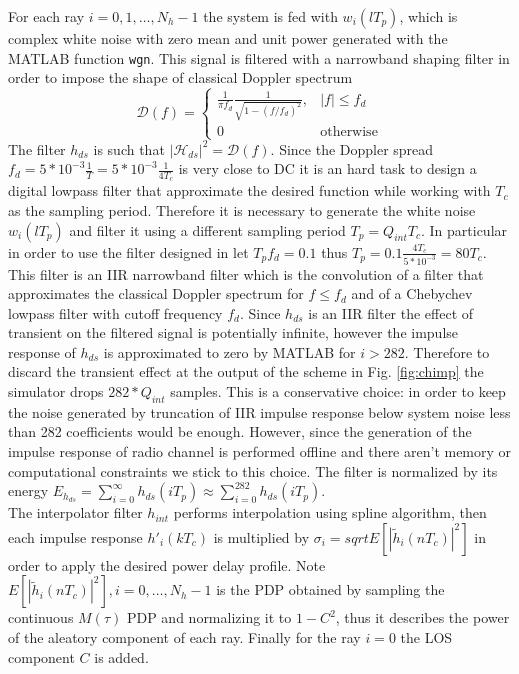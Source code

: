 \documentclass[10pt]{article}
\begin{document}
For each ray $i = 0, 1, \dots, N_h -1$ the system is fed with $w_i(lT_p)$, which is complex white noise with zero mean and unit power generated with the MATLAB function \texttt{wgn}. This signal is filtered with a narrowband shaping filter in order to impose the shape of classical Doppler spectrum
\begin{equation}
  \mathcal{D}(f) =  \begin{cases} \frac{1}{\pi f_d} \frac{1}{\sqrt{1-(f/f_d)^2}}, & |f| \le f_d \\
                                  0                                              & \mbox{otherwise}
                   \end{cases}
\end{equation}
The filter $h_{ds}$ is such that $|\mathcal{H}_{ds}|^2 = \mathcal{D}(f)$. Since the Doppler spread $f_d = 5*10^{-3}\frac{1}{T} = 5*10^{-3}\frac{1}{4T_c}$ is very close to DC it is an hard task to design a digital lowpass filter that approximate the desired function while working with $T_c$ as the sampling period. Therefore it is necessary to generate the white noise $w_i(lT_p)$ and filter it using a different sampling period $T_p = Q_{int}T_c$. In particular in order to use the filter designed in \cite{anachugg} let $T_p f_d = 0.1$ thus $T_p = 0.1 \frac{4 T_c}{5*10^{-3}} = 80 T_c$. \\
This filter is an IIR narrowband filter which is the convolution of a filter that approximates the classical Doppler spectrum for $f \le f_d$ and of a Chebychev lowpass filter with cutoff frequency $f_d$. Since $h_{ds}$ is an IIR filter the effect of transient on the filtered signal is potentially infinite, however the impulse response of $h_{ds}$ is approximated to zero by MATLAB for $i > 282$. Therefore to discard the transient effect at the output of the scheme in Fig. \ref{fig:chimp} the simulator drops $282*Q_{int}$ samples. This is a conservative choice: in order to keep the noise generated by truncation of IIR impulse response below system noise less than 282 coefficients would be enough. However, since the generation of the impulse response of radio channel is performed offline and there aren't memory or computational constraints we stick to this choice. The filter is normalized by its energy $E_{h_{ds}} = \sum_{i = 0}^{\infty} h_{ds} (iT_p) \approx \sum_{i = 0}^{282} h_{ds} (iT_p)$. \\
The interpolator filter $h_{int}$ performs interpolation using spline algorithm, then each impulse response $h'_i(kT_c)$ is multiplied by $\sigma_i = sqrt{E[|\tilde{h}_i(nT_c)|^2]}$ in order to apply the desired power delay profile. Note $E[|\tilde{h}_i(nT_c)|^2], i = 0, \dots, N_h -1$ is the PDP obtained by sampling the continuous $M(\tau)$ PDP and normalizing it to $1-C^2$, thus it describes the power of the aleatory component of each ray. Finally for the ray $i = 0$ the LOS component $C$ is added. \\
\end{document}
